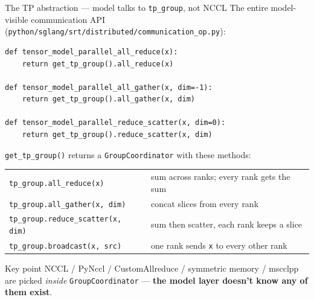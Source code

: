 \documentclass[aspectratio=169,10pt]{beamer}
\begin{document}
\begin{frame}[fragile]{The TP abstraction --- model talks to \texttt{tp\_group}, not NCCL}
  \footnotesize
  The entire model-visible communication API (\texttt{python/sglang/srt/distributed/communication\_op.py}):
\begin{lstlisting}
def tensor_model_parallel_all_reduce(x):
    return get_tp_group().all_reduce(x)

def tensor_model_parallel_all_gather(x, dim=-1):
    return get_tp_group().all_gather(x, dim)

def tensor_model_parallel_reduce_scatter(x, dim=0):
    return get_tp_group().reduce_scatter(x, dim)
\end{lstlisting}
  \vspace{-0.15cm}
  \texttt{get\_tp\_group()} returns a \texttt{GroupCoordinator} with these methods:
  \begin{center}\scriptsize
  \begin{tabular}{l p{7cm}}
    \toprule
    \texttt{tp\_group.all\_reduce(x)}          & sum across ranks; every rank gets the sum \\
    \texttt{tp\_group.all\_gather(x, dim)}     & concat slices from every rank \\
    \texttt{tp\_group.reduce\_scatter(x, dim)} & sum then scatter, each rank keeps a slice \\
    \texttt{tp\_group.broadcast(x, src)}       & one rank sends \texttt{x} to every other rank \\
    \bottomrule
  \end{tabular}
  \end{center}
  \vspace{0.2cm}
  \begin{block}{Key point}\small
    NCCL / PyNccl / CustomAllreduce / symmetric memory / mscclpp are picked \emph{inside}
    \texttt{GroupCoordinator} --- \textbf{the model layer doesn't know any of them exist}.
  \end{block}
\end{frame}
\end{document}
